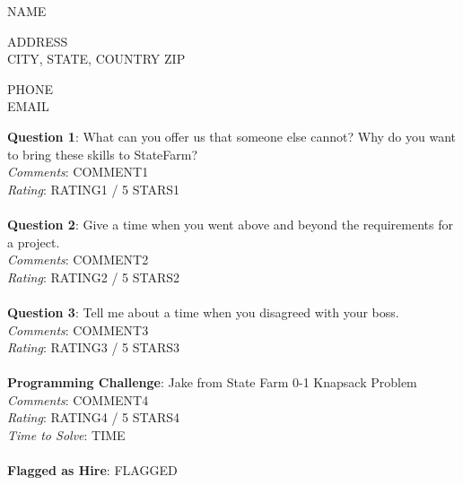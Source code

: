 \documentclass[12pt]{article}
\begin{document}
{\LARGE \begin{center}{NAME}\end{center}}

\begin{multicols}{2}
\noindent
{ADDRESS} \\
{CITY}, {STATE}, {COUNTRY} {ZIP}
\columnbreak

\noindent
{PHONE} \\
{EMAIL}
\end{multicols}

\noindent
\textbf{Question 1}: What can you offer us that someone else cannot? Why do you want to bring these skills to StateFarm?
\\\noindent
\textit{Comments}: {COMMENT1}
\\\noindent
\textit{Rating}: {RATING1} / 5 {STARS1}
\\\\
\noindent
\textbf{Question 2}: Give a time when you went above and beyond the requirements for a project.
\\\noindent
\textit{Comments}: {COMMENT2}
\\\noindent
\textit{Rating}: {RATING2} / 5 {STARS2}
\\\\
\noindent
\textbf{Question 3}: Tell me about a time when you disagreed with your boss.
\\\noindent
\textit{Comments}: {COMMENT3}
\\\noindent
\textit{Rating}: {RATING3} / 5 {STARS3}
\\\\
\noindent
\textbf{Programming Challenge}: Jake from State Farm 0-1 Knapsack Problem
\\\noindent
\textit{Comments}: {COMMENT4}
\\\noindent
\textit{Rating}: {RATING4} / 5 {STARS4}
\\\noindent
\textit{Time to Solve}: {TIME}
\\\\
\textbf{Flagged as Hire}: {FLAGGED}
\\\\ 
\end{document}
